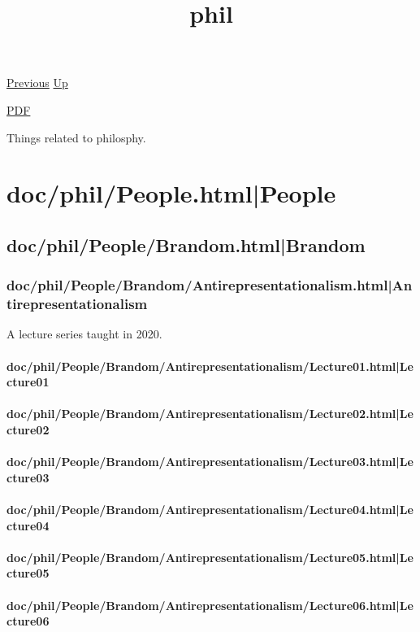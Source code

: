 \documentclass[12pt,a4paper]{report}
\begin{document}
 \href{doc/jokes.html}{Previous} 
 \href{doc.html}{Up} 

 \href{doc/phil.pdf}{PDF} 
\title{phil}

\tableofcontents
Things related to philosphy.
\part{doc/phil/People.html|People}

\chapter{doc/phil/People/Brandom.html|Brandom}

\section{doc/phil/People/Brandom/Antirepresentationalism.html|Antirepresentationalism}
A lecture series taught in 2020.
\subsection{doc/phil/People/Brandom/Antirepresentationalism/Lecture01.html|Lecture01}

\subsection{doc/phil/People/Brandom/Antirepresentationalism/Lecture02.html|Lecture02}

\subsection{doc/phil/People/Brandom/Antirepresentationalism/Lecture03.html|Lecture03}

\subsection{doc/phil/People/Brandom/Antirepresentationalism/Lecture04.html|Lecture04}

\subsection{doc/phil/People/Brandom/Antirepresentationalism/Lecture05.html|Lecture05}

\subsection{doc/phil/People/Brandom/Antirepresentationalism/Lecture06.html|Lecture06}
\end{document}
